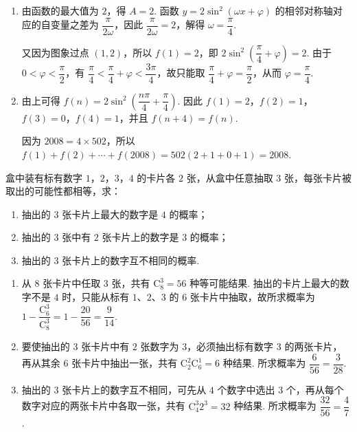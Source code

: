 \begin{solution}
\begin{enumerate}
\item 由函数的最大值为 \(2\)，得 \(A=2\). 函数 \(y=2\sin^2(\omega x+\varphi)\) 的相邻对称轴对应的自变量之差为 \(\dfrac{\pi}{2\omega}\)，因此 \(\dfrac{\pi}{2\omega}=2\)，解得 \(\omega=\dfrac{\pi}{4}\).

又因为图象过点 \((1,2)\)，所以 \(f(1)=2\)，即 \(2\sin^2\left(\dfrac{\pi}{4}+\varphi\right)=2\). 由于 \(0<\varphi<\dfrac{\pi}{2}\)，有 \(\dfrac{\pi}{4}<\dfrac{\pi}{4}+\varphi<\dfrac{3\pi}{4}\)，故只能取 \(\dfrac{\pi}{4}+\varphi=\dfrac{\pi}{2}\)，从而 \(\varphi=\dfrac{\pi}{4}\).
\item 由上可得 \(f(n)=2\sin^2\left(\dfrac{n\pi}{4}+\dfrac{\pi}{4}\right)\). 因此 \(f(1)=2\)，\(f(2)=1\)，\(f(3)=0\)，\(f(4)=1\)，并且 \(f(n+4)=f(n)\).

因为 \(2008=4\times502\)，所以 \(f(1)+f(2)+\cdots+f(2008)=502(2+1+0+1)=2008\).
\end{enumerate}
\end{solution}

\begin{problem}
盒中装有标有数字 \(1\)，\(2\)，\(3\)，\(4\) 的卡片各 \(2\) 张，从盒中任意抽取 \(3\) 张，每张卡片被取出的可能性都相等，求：

\begin{enumerate}
\item 抽出的 \(3\) 张卡片上最大的数字是 \(4\) 的概率；
\item 抽出的 \(3\) 张中有 \(2\) 张卡片上的数字是 \(3\) 的概率；
\item 抽出的 \(3\) 张卡片上的数字互不相同的概率.
\end{enumerate}
\end{problem}

\begin{solution}
\begin{enumerate}
\item 从 \(8\) 张卡片中任取 \(3\) 张，共有 \(\mathrm C_8^3=56\) 种等可能结果. 抽出的卡片上最大的数字不是 \(4\) 时，只能从标有 \(1\)、\(2\)、\(3\) 的 \(6\) 张卡片中抽取，故所求概率为 \(1-\dfrac{\mathrm C_6^3}{\mathrm C_8^3}=1-\dfrac{20}{56}=\dfrac{9}{14}\).
\item 要使抽出的 \(3\) 张卡片中有 \(2\) 张数字为 \(3\)，必须抽出标有数字 \(3\) 的两张卡片，再从其余 \(6\) 张卡片中抽出一张，共有 \(\mathrm C_2^2\mathrm C_6^1=6\) 种结果. 所求概率为 \(\dfrac{6}{56}=\dfrac{3}{28}\).
\item 抽出的 \(3\) 张卡片上的数字互不相同，可先从 \(4\) 个数字中选出 \(3\) 个，再从每个数字对应的两张卡片中各取一张，共有 \(\mathrm C_4^3 2^3=32\) 种结果. 所求概率为 \(\dfrac{32}{56}=\dfrac{4}{7}\).
\end{enumerate}
\end{solution}


